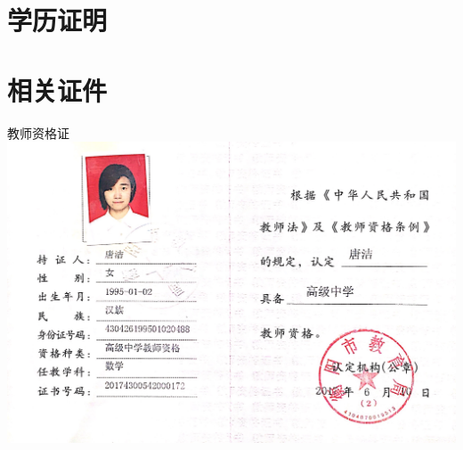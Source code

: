 \documentclass[UFT8]{ctexart}%
\begin{document}
\section{学历证明}






\clearpage
\section{相关证件}
\begin{center}
教师资格证
  \includegraphics[scale=0.20]{figs/教师资格证.JPG }
  

\end{center}
\end{document}
